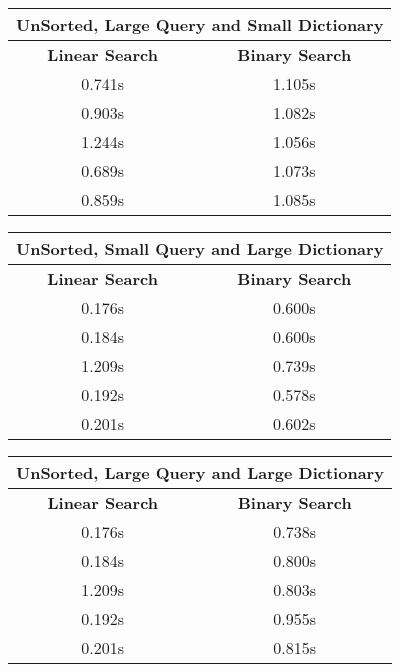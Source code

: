 \documentclass{article}
\begin{document}
\begin{table}[h]
\begin{tabular}{|c|c|}
\hline
\multicolumn{2}{|c|}{\textbf{UnSorted, Large Query and Small Dictionary}}     \\ \hline \hline
\textbf{Linear Search} & {\textbf{Binary Search}}   \\ \hline \hline
 0.741s                 &  1.105s                \\ \hline
 0.903s                 &  1.082s               \\ \hline
 1.244s                 &  1.056s               \\ \hline
 0.689s                 &  1.073s               \\ \hline
 0.859s                 &  1.085s               \\ \hline
\end{tabular}
\end{table}
\newpage\newpage
\begin{table}[h]
\begin{tabular}{|c|c|}
\hline
\multicolumn{2}{|c|}{\textbf{UnSorted, Small Query and Large Dictionary}}     \\ \hline \hline
\textbf{Linear Search} & {\textbf{Binary Search}}   \\ \hline \hline
 0.176s                 &  0.600s                \\ \hline
 0.184s                 &  0.600s               \\ \hline
 1.209s                 &  0.739s               \\ \hline
 0.192s                 &  0.578s               \\ \hline
 0.201s                 &  0.602s               \\ \hline
\end{tabular}
\end{table}
\begin{table}[h]
\begin{tabular}{|c|c|}
\hline
\multicolumn{2}{|c|}{\textbf{UnSorted, Large Query and Large Dictionary}}     \\ \hline \hline
\textbf{Linear Search} & {\textbf{Binary Search}}   \\ \hline \hline
 0.176s                 &  0.738s                \\ \hline
 0.184s                 &  0.800s               \\ \hline
 1.209s                 &  0.803s               \\ \hline
 0.192s                 &  0.955s               \\ \hline
 0.201s                 &  0.815s               \\ \hline
\end{tabular}
\end{table}
\end{document}
